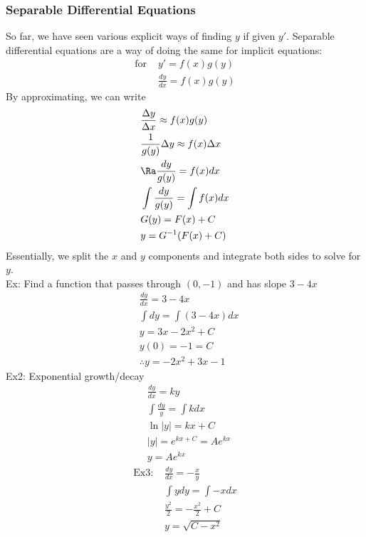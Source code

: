 \subsubsection{Separable Differential Equations}
So far, we have seen various explicit ways of finding $y$ if given $y'$. Separable differential equations are a way of doing the same for implicit equations:
\begin{align*}
    \text{for }&y'=f(x)g(y)\\
    &\frac{dy}{dx}=f(x)g(y)
\end{align*}
By approximating, we can write
\begin{align*}
    &\frac{\Delta y}{\Delta x}\approx f(x)g(y)\\
    &\frac{1}{g(y)}\Delta y\approx f(x)\Delta x\\
    &\Ra \frac{dy}{g(y)}=f(x)dx\\
    &\int \frac{dy}{g(y)}=\int f(x)dx\\
    &G(y)=F(x)+C\\
    &y=G^{-1}(F(x)+C)
\end{align*}
Essentially, we split the $x$ and $y$ components and integrate both sides to solve for $y$.\\
Ex: Find a function that passes through $(0,-1)$ and has slope $3-4x$
\begin{align*}
    &\frac{dy}{dx}=3-4x\\
    &\int dy=\int(3-4x)dx\\
    &y=3x-2x^2+C\\
    &y(0)=-1=C\\
    &\therefore y=-2x^2+3x-1
\end{align*}
Ex2: Exponential growth/decay
\begin{align*}
    &\frac{dy}{dx}=ky\\
    &\int\frac{dy}{y}=\int kdx\\
    &\ln|y|=kx+C\\
    &|y|=e^{kx+C}=Ae^{kx}\\
    &y=Ae^{kx}
\end{align*}
\begin{align*}
    \text{Ex3: }&\frac{dy}{dx}=-\frac{x}{y}\\
    &\int ydy=\int -xdx\\
    &\frac{y^2}{2}=-\frac{x^2}{2}+C\\
    &y=\sqrt{C-x^2}
\end{align*}

